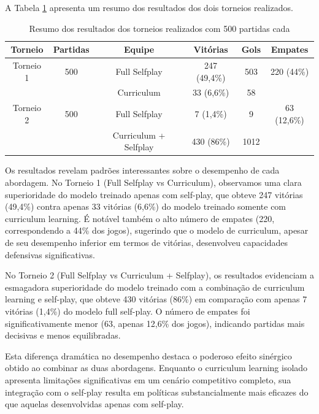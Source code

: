A Tabela \ref{tab:resultados_torneios} apresenta um resumo dos resultados dos dois torneios realizados.

\begin{table}[H]
    \centering
    \begin{tabular}{|c|c|c|c|c|c|}
        \hline
        \textbf{Torneio} & \textbf{Partidas} & \textbf{Equipe} & \textbf{Vitórias} & \textbf{Gols} & \textbf{Empates} \\
        \hline
        Torneio 1 & \multicolumn{1}{c|}{500} & Full Selfplay & 247 (49,4\%) & 503 & \multicolumn{1}{c|}{220 (44\%)} \\
        \cline{3-5}
        & & Curriculum & 33 (6,6\%) & 58 & \\
        \hline
        Torneio 2 & \multicolumn{1}{c|}{500} & Full Selfplay & 7 (1,4\%) & 9 & \multicolumn{1}{c|}{63 (12,6\%)} \\
        \cline{3-5}
        & & Curriculum + Selfplay & 430 (86\%) & 1012 & \\
        \hline
    \end{tabular}
    \caption{Resumo dos resultados dos torneios realizados com 500 partidas cada}
    \label{tab:resultados_torneios}
\end{table}

Os resultados revelam padrões interessantes sobre o desempenho de cada abordagem. No Torneio 1 (Full Selfplay vs Curriculum), observamos uma clara superioridade do modelo treinado apenas com self-play, que obteve 247 vitórias (49,4\%) contra apenas 33 vitórias (6,6\%) do modelo treinado somente com curriculum learning. É notável também o alto número de empates (220, correspondendo a 44\% dos jogos), sugerindo que o modelo de curriculum, apesar de seu desempenho inferior em termos de vitórias, desenvolveu capacidades defensivas significativas.

No Torneio 2 (Full Selfplay vs Curriculum + Selfplay), os resultados evidenciam a esmagadora superioridade do modelo treinado com a combinação de curriculum learning e self-play, que obteve 430 vitórias (86\%) em comparação com apenas 7 vitórias (1,4\%) do modelo full self-play. O número de empates foi significativamente menor (63, apenas 12,6\% dos jogos), indicando partidas mais decisivas e menos equilibradas.

Esta diferença dramática no desempenho destaca o poderoso efeito sinérgico obtido ao combinar as duas abordagens. Enquanto o curriculum learning isolado apresenta limitações significativas em um cenário competitivo completo, sua integração com o self-play resulta em políticas substancialmente mais eficazes do que aquelas desenvolvidas apenas com self-play.

